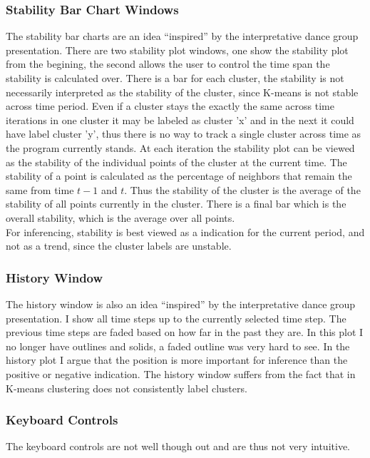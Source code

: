\documentclass{article}
\begin{document}
\begin{multicols}{2}
\subsubsection{Stability Bar Chart Windows}
The stability bar charts are an idea ``inspired'' by the interpretative dance group presentation.  There are two stability plot windows, one show the stability plot from the begining, the second allows the user to control the time span the stability is calculated over.  There is a bar for each cluster, the stability is not necessarily interpreted as the stability of the cluster, since K-means is not stable across time period.  Even if a cluster stays the exactly the same across time iterations in one cluster it may be labeled as cluster 'x' and in the next it could have label cluster 'y', thus there is no way to track a single cluster across time as the program currently stands.  At each iteration the stability plot can be viewed as the stability of the individual points of the cluster at the current time.  The stability of a point is calculated as the percentage of neighbors that remain the same from time $t-1$ and $t$.  Thus the stability of the cluster is the average of the stability of all points currently in the cluster.  There is a final bar which is the overall stability, which is the average over all points. \\

\noindent For inferencing, stability is best viewed as a indication for the current period, and not as a trend, since the cluster labels are unstable.
\subsubsection{History Window}
The history window is also an idea ``inspired'' by the interpretative dance group presentation.  I show all time steps up to the currently selected time step.  The previous time steps are faded based on how far in the past they are.  In this plot I no longer have outlines and solids, a faded outline was very hard to see.  In the history plot I argue that the position is more important for inference than the positive or negative indication.  The history window suffers from the fact that in K-means clustering does not consistently label clusters.  
\subsubsection{Keyboard Controls}
The keyboard controls are not well though out and are thus not very intuitive.


\end{multicols}
\end{document}
